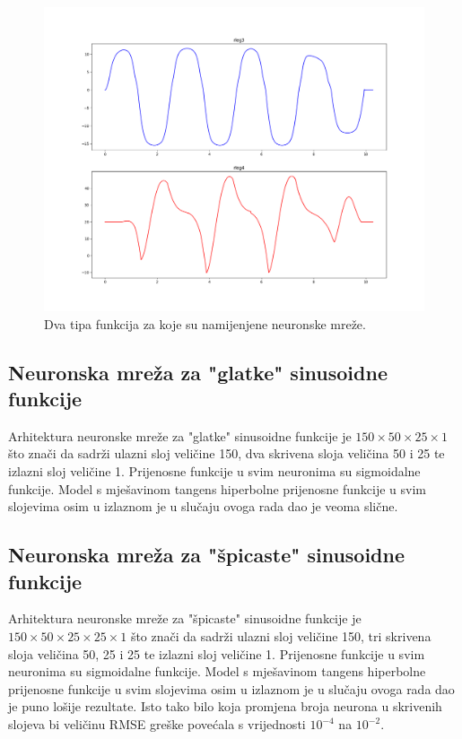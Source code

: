 \documentclass[times, utf8, zavrsni]{fer}
\begin{document}
\begin{figure}[htb!]
\centering
\includegraphics[height=0.75\textwidth]{functionTypes.png}
\caption{Dva tipa funkcija za koje su namijenjene neuronske mreže.}
\label{fig:func_types}
\end{figure}


\newpage
\subsection{Neuronska mreža za "glatke" sinusoidne funkcije}
Arhitektura neuronske mreže za "glatke" sinusoidne funkcije je $150\times50\times25\times1$ što znači da sadrži ulazni sloj veličine 150, dva skrivena sloja veličina 50 i 25 te izlazni sloj veličine 1. Prijenosne funkcije u svim neuronima su sigmoidalne funkcije. Model s mješavinom tangens hiperbolne prijenosne funkcije u svim slojevima osim u izlaznom je u slučaju ovoga rada dao je veoma slične.

\subsection{Neuronska mreža za "špicaste" sinusoidne funkcije}
Arhitektura neuronske mreže za "špicaste" sinusoidne funkcije je $150\times50\times25\times25\times1$ što znači da sadrži ulazni sloj veličine 150, tri skrivena sloja veličina 50, 25 i 25 te izlazni sloj veličine 1. Prijenosne funkcije u svim neuronima su sigmoidalne funkcije. Model s mješavinom tangens hiperbolne prijenosne funkcije u svim slojevima osim u izlaznom je u slučaju ovoga rada dao je puno lošije rezultate. Isto tako bilo koja promjena broja neurona u skrivenih slojeva bi veličinu RMSE greške povećala s vrijednosti $10^{-4}$ na $10^{-2}$.
\end{document}
